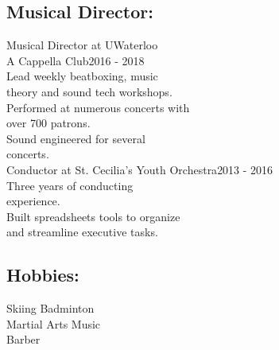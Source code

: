 \documentclass[letterpaper]{kevin-resume} %
\begin{document}
{\begin{minipage}[t]{0.30\textwidth}
\subsection{Musical Director:}
{Musical Director at UWaterloo\\ A Cappella Club}\hspace{6mm}2016 - 2018\\
	\textbullet{} Lead weekly beatboxing, music\\
	\hspace{3mm}theory and sound tech workshops.\\
	\textbullet{} Performed at numerous concerts with\\
	\hspace{3mm}over 700 patrons.\\
	\textbullet{} Sound engineered for several\\
	\hspace{3mm}concerts.\\
{Conductor at St. Cecilia’s Youth Orchestra}\hspace{14mm}2013 - 2016\\
	\textbullet{} Three years of conducting\\
	\hspace{3mm}experience.\\
	\textbullet{} Built spreadsheets tools to organize\\
	\hspace{3mm}and streamline executive tasks.

\sectionspace %
\subsection{Hobbies:}
Skiing \textbullet{} 
Badminton \\
Martial Arts \textbullet{} 
Music \\
Barber

\hspace{5mm}
\end{minipage}} %


\end{document}
